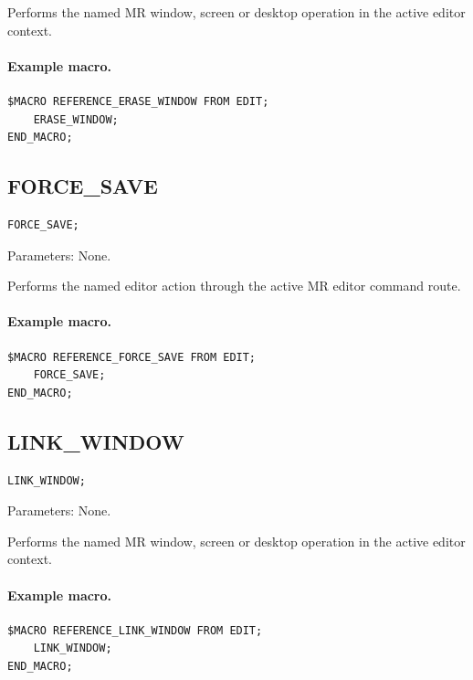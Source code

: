 \documentclass[a4paper,10pt,twoside,openany]{book}
\newenvironment{mrmacextension}{\begin{changebar}}{\end{changebar}}
\begin{document}
Performs the named MR window, screen or desktop operation in the active editor context.

\paragraph{Example macro.}
\begin{verbatim}
$MACRO REFERENCE_ERASE_WINDOW FROM EDIT;
    ERASE_WINDOW;
END_MACRO;
\end{verbatim}

\begin{mrmacextension}
\label{prim:procedure-force-save}
\subsection*{FORCE\_SAVE}
\begin{verbatim}
FORCE_SAVE;
\end{verbatim}
Parameters: None.

Performs the named editor action through the active MR editor command route.

\paragraph{Example macro.}
\begin{verbatim}
$MACRO REFERENCE_FORCE_SAVE FROM EDIT;
    FORCE_SAVE;
END_MACRO;
\end{verbatim}
\end{mrmacextension}

\label{prim:procedure-link-window}
\subsection*{LINK\_WINDOW}
\begin{verbatim}
LINK_WINDOW;
\end{verbatim}
Parameters: None.

Performs the named MR window, screen or desktop operation in the active editor context.

\paragraph{Example macro.}
\begin{verbatim}
$MACRO REFERENCE_LINK_WINDOW FROM EDIT;
    LINK_WINDOW;
END_MACRO;
\end{verbatim}
\end{document}
